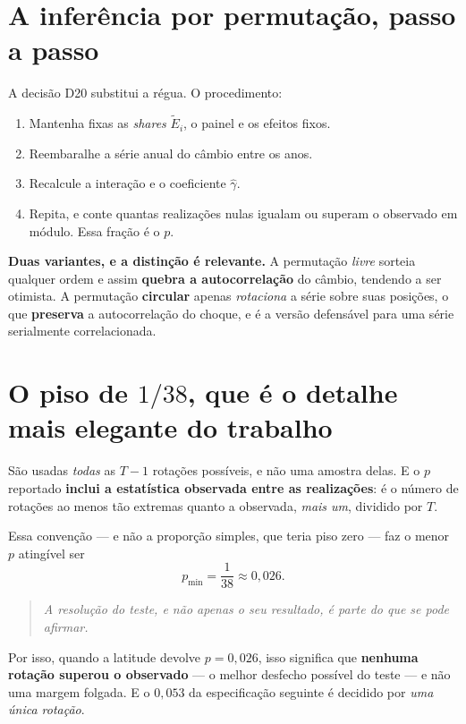 \section{A inferência por permutação, passo a passo}

A decisão D20 substitui a régua. O procedimento:

\begin{enumerate}
\item Mantenha fixas as \emph{shares} $\tilde{E}_i$, o painel e os efeitos
fixos.
\item Reembaralhe a série anual do câmbio entre os anos.
\item Recalcule a interação e o coeficiente $\hat{\gamma}$.
\item Repita, e conte quantas realizações nulas igualam ou superam o observado
em módulo. Essa fração é o $p$.
\end{enumerate}

\textbf{Duas variantes, e a distinção é relevante.} A permutação \emph{livre}
sorteia qualquer ordem e assim \textbf{quebra a autocorrelação} do câmbio,
tendendo a ser otimista. A permutação \textbf{circular} apenas
\emph{rotaciona} a série sobre suas posições, o que \textbf{preserva} a
autocorrelação do choque, e é a versão defensável para uma série serialmente
correlacionada.

\section{O piso de $1/38$, que é o detalhe mais elegante do trabalho}

São usadas \emph{todas} as $T-1$ rotações possíveis, e não uma amostra delas. E
o $p$ reportado \textbf{inclui a estatística observada entre as realizações}:
é o número de rotações ao menos tão extremas quanto a observada, \emph{mais
um}, dividido por $T$.

Essa convenção --- e não a proporção simples, que teria piso zero --- faz o
menor $p$ atingível ser
\begin{equation}
p_{\min} = \frac{1}{38} \approx 0{,}026 .
\end{equation}

\begin{quote}\itshape\color{cortinta}
A resolução do teste, e não apenas o seu resultado, é parte do que se pode
afirmar.
\end{quote}

Por isso, quando a latitude devolve $p = 0{,}026$, isso significa que
\textbf{nenhuma rotação superou o observado} --- o melhor desfecho possível do
teste --- e não uma margem folgada. E o $0{,}053$ da especificação seguinte é
decidido por \emph{uma única rotação}.

